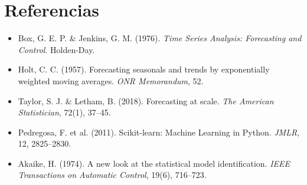 \documentclass[10pt,twocolumn]{article}
\begin{document}
\section*{Referencias}

\small
\begin{itemize}[leftmargin=*, itemsep=1pt, topsep=2pt]
  \item Box, G. E. P. \& Jenkins, G. M. (1976). \textit{Time Series Analysis:
        Forecasting and Control}. Holden-Day.
  \item Holt, C. C. (1957). Forecasting seasonals and trends by exponentially
        weighted moving averages. \textit{ONR Memorandum}, 52.
  \item Taylor, S. J. \& Letham, B. (2018). Forecasting at scale.
        \textit{The American Statistician}, 72(1), 37--45.
  \item Pedregosa, F. et al. (2011). Scikit-learn: Machine Learning in Python.
        \textit{JMLR}, 12, 2825--2830.
  \item Akaike, H. (1974). A new look at the statistical model identification.
        \textit{IEEE Transactions on Automatic Control}, 19(6), 716--723.
\end{itemize}
\end{document}
